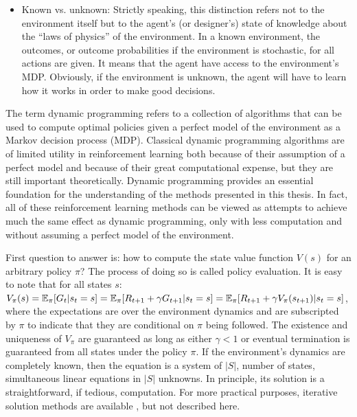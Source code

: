 \begin{itemize}
\item Known vs. unknown: Strictly speaking, this distinction refers not to the environment itself but to the agent’s (or designer’s) state of knowledge about the “laws of physics” of the environment. In a known environment, the outcomes, or outcome probabilities if the environment is stochastic, for all actions are given. It means that the agent have access to the environment's MDP. Obviously, if the environment is unknown, the agent will have to learn how it works in order to make good decisions.
\end{itemize}

The term dynamic programming refers to a collection of algorithms that can be used to compute optimal policies given a perfect model of the environment as a Markov decision process (MDP). Classical dynamic programming algorithms are of limited utility in reinforcement learning both because of their assumption of a perfect model and because of their great computational expense, but they are still important theoretically. Dynamic programming provides an essential foundation for the understanding of the methods presented in this thesis. In fact, all of these reinforcement learning methods can be viewed as attempts to achieve much the same effect as dynamic programming, only with less computation and without assuming a perfect model of the environment.

First question to answer is: how to compute the state value function $V(s)$ for an arbitrary policy $\pi$? The process of doing so is called policy evaluation. It is easy to note that for all states $s$: $V_\pi(s) = \operatorname{\mathbb{E}}_\pi[G_t | s_t = s] = \operatorname{\mathbb{E}}_\pi[R_{t+1} + \gamma G_{t+1} | s_t = s] = \operatorname{\mathbb{E}}_\pi[R_{t+1} + \gamma V_\pi(s_{t+1}) | s_t = s]$, where the expectations are over the environment dynamics and are subscripted by $\pi$ to indicate that they are conditional on $\pi$ being followed. The existence and uniqueness of $V_\pi$ are guaranteed as long as either $\gamma < 1$ or eventual termination is guaranteed from all states under the policy $\pi$. If the environment’s dynamics are completely known, then the equation is a system of $|S|$, number of states, simultaneous linear equations in $|S|$ unknowns. In principle, its solution is a straightforward, if tedious, computation. For more practical purposes, iterative solution methods are available \cite{Book.RLAI}, but not described here.


